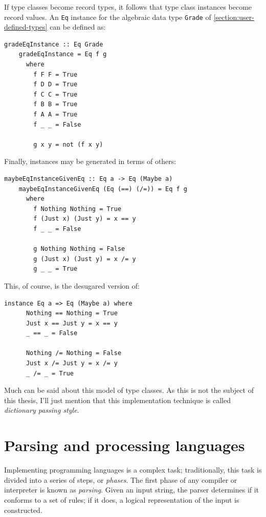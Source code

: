 \documentclass[UdineBachThesis,american,11pt]{PhdThesis}
\begin{document}
  If type classes become record types, it follows that type class instances
  become record values. An \mbox{\texttt{Eq}} instance for the algebraic data
  type \mbox{\texttt{Grade}} of \autoref{section:user-defined-types} can be
  defined as:

  \begin{Verbatim}[gobble=4,fontsize=\small]
    gradeEqInstance :: Eq Grade
    gradeEqInstance = Eq f g
      where
        f F F = True
        f D D = True
        f C C = True
        f B B = True
        f A A = True
        f _ _ = False

        g x y = not (f x y)
  \end{Verbatim}

  Finally, instances may be generated in terms of others:

  \begin{Verbatim}[gobble=4,fontsize=\small]
    maybeEqInstanceGivenEq :: Eq a -> Eq (Maybe a)
    maybeEqInstanceGivenEq (Eq (==) (/=)) = Eq f g
      where
        f Nothing Nothing = True
        f (Just x) (Just y) = x == y
        f _ _ = False

        g Nothing Nothing = False
        g (Just x) (Just y) = x /= y
        g _ _ = True
  \end{Verbatim}

  This, of course, is the desugared version of:

  \begin{Verbatim}[gobble=4,fontsize=\small]
    instance Eq a => Eq (Maybe a) where
      Nothing == Nothing = True
      Just x == Just y = x == y
      _ == _ = False

      Nothing /= Nothing = False
      Just x /= Just y = x /= y
      _ /= _ = True
  \end{Verbatim}

  Much can be said about this model of type classes. As this is not the subject
  of this thesis, I'll just mention that this implementation technique is called
  \emph{dictionary passing style}.

  \chapter{Parsing and processing languages}

  Implementing programming languages is a complex task; traditionally, this task
  is divided into a series of steps, or \emph{phases}. The first phase of any
  compiler or interpreter is known as \emph{parsing}. Given an input string, the
  parser determines if it conforms to a set of rules; if it does, a logical
  representation of the input is constructed.
\end{document}
